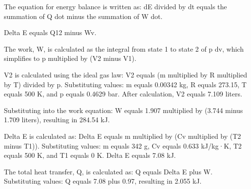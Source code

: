 The equation for energy balance is written as:  
dE divided by dt equals the summation of Q dot minus the summation of W dot.  

Delta E equals Q12 minus Wv.  

The work, W, is calculated as the integral from state 1 to state 2 of p dv, which simplifies to p multiplied by (V2 minus V1).  

V2 is calculated using the ideal gas law:  
V2 equals (m multiplied by R multiplied by T) divided by p.  
Substituting values:  
m equals 0.00342 kg, R equals 273.15, T equals 500 K, and p equals 0.4629 bar.  
After calculation, V2 equals 7.109 liters.  

Substituting into the work equation:  
W equals 1.907 multiplied by (3.744 minus 1.709 liters), resulting in 284.54 kJ.  

Delta E is calculated as:  
Delta E equals m multiplied by (Cv multiplied by (T2 minus T1)).  
Substituting values:  
m equals 342 g, Cv equals 0.633 kJ/kg·K, T2 equals 500 K, and T1 equals 0 K.  
Delta E equals 7.08 kJ.  

The total heat transfer, Q, is calculated as:  
Q equals Delta E plus W.  
Substituting values:  
Q equals 7.08 plus 0.97, resulting in 2.055 kJ.